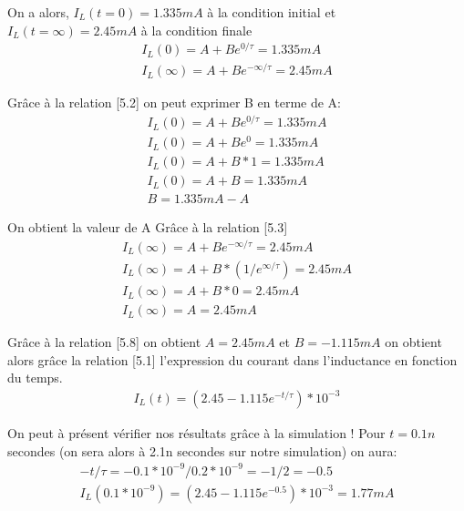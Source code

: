 \documentclass{homeworg}
\begin{document}
On a alors, $I_L(t=0) = 1.335mA$ à la condition initial et $I_L(t=\infty)= 2.45mA$ à la condition finale
\begin{align}
    I_L(0) = A + B e^{0/ \tau} = 1.335mA\\
    I_L(\infty) = A + B e^{-\infty/ \tau} = 2.45mA
\end{align}

Grâce à la relation [5.2] on peut exprimer B en terme de A:
\begin{align}
    I_L(0) = A + B e^{0/ \tau} = 1.335mA\\
    I_L(0) = A + B e^{0} = 1.335mA\\
    I_L(0) = A + B * 1 = 1.335mA\\
    I_L(0) = A + B = 1.335mA\\
    B = 1.335mA - A
\end{align}

On obtient la valeur de A Grâce à la relation [5.3]
\begin{align}
    I_L(\infty) = A + B e^{-\infty/ \tau} = 2.45mA\\
    I_L(\infty) = A + B * (1/e^{\infty/ \tau}) = 2.45mA\\
    I_L(\infty) = A + B * 0 = 2.45mA\\
    I_L(\infty) = A = 2.45mA
\end{align}

Grâce à la relation [5.8] on obtient $A = 2.45mA$ et $B = -1.115mA$ on obtient alors grâce la relation [5.1] l'expression du courant dans l'inductance en fonction du temps.
\begin{align}
    I_L(t) = (2.45 - 1.115e^{-t / \tau}) * 10^{-3}
\end{align}

On peut à présent vérifier nos résultats grâce à la simulation !
Pour $t=0.1n$ secondes (on sera alors à 2.1n secondes sur notre simulation) on aura:
\begin{align}
    -t / \tau = -0.1 * 10^{-9} / 0.2 * 10^{-9} = -1/2 = -0.5\\
    I_L(0.1 * 10^{-9}) = (2.45 - 1.115e^{-0.5}) * 10^{-3} = 1.77mA
\end{align}
\end{document}
